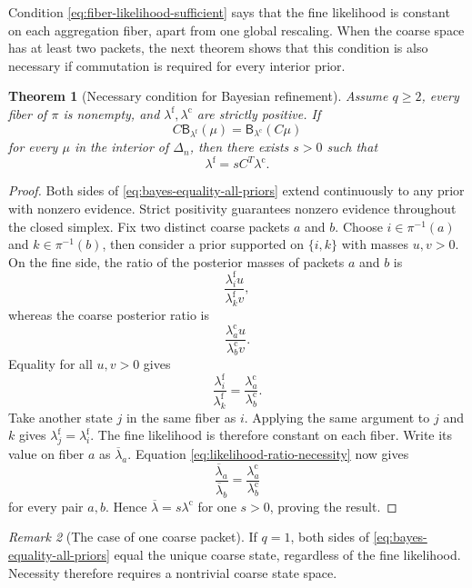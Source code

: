 \documentclass[11pt]{article}
\newtheorem{theorem}{Theorem}[section]
\theoremstyle{definition}
\theoremstyle{remark}
\newtheorem{remark}[theorem]{Remark}
\newcommand{\fine}{\mathrm f}
\newcommand{\coarse}{\mathrm c}
\newcommand{\Bup}{\mathsf B}
\begin{document}
Condition \eqref{eq:fiber-likelihood-sufficient} says that the fine likelihood is constant on each aggregation fiber, apart from one global rescaling.  When the coarse space has at least two packets, the next theorem shows that this condition is also necessary if commutation is required for every interior prior.

\begin{theorem}[Necessary condition for Bayesian refinement]\label{thm:bayes-necessity}
Assume $q\geq2$, every fiber of $\pi$ is nonempty, and $\lambda^{\fine},\lambda^{\coarse}$ are strictly positive.  If
\begin{equation}\label{eq:bayes-equality-all-priors}
  C\Bup_{\lambda^{\fine}}(\mu)
  =
  \Bup_{\lambda^{\coarse}}(C\mu)
\end{equation}
for every $\mu$ in the interior of $\Delta_n$, then there exists $s>0$ such that
\[
  \lambda^{\fine}=sC^T\lambda^{\coarse}.
\]
\end{theorem}

\begin{proof}
Both sides of \eqref{eq:bayes-equality-all-priors} extend continuously to any prior with nonzero evidence.  Strict positivity guarantees nonzero evidence throughout the closed simplex.  Fix two distinct coarse packets $a$ and $b$.  Choose $i\in\pi^{-1}(a)$ and $k\in\pi^{-1}(b)$, then consider a prior supported on $\{i,k\}$ with masses $u,v>0$.  On the fine side, the ratio of the posterior masses of packets $a$ and $b$ is
\[
  \frac{\lambda_i^{\fine}u}{\lambda_k^{\fine}v},
\]
whereas the coarse posterior ratio is
\[
  \frac{\lambda_a^{\coarse}u}{\lambda_b^{\coarse}v}.
\]
Equality for all $u,v>0$ gives
\begin{equation}\label{eq:likelihood-ratio-necessity}
  \frac{\lambda_i^{\fine}}{\lambda_k^{\fine}}
  =
  \frac{\lambda_a^{\coarse}}{\lambda_b^{\coarse}}.
\end{equation}
Take another state $j$ in the same fiber as $i$.  Applying the same argument to $j$ and $k$ gives $\lambda_j^{\fine}=\lambda_i^{\fine}$.  The fine likelihood is therefore constant on each fiber.  Write its value on fiber $a$ as $\overline\lambda_a$.  Equation \eqref{eq:likelihood-ratio-necessity} now gives
\[
  \frac{\overline\lambda_a}{\overline\lambda_b}
  =
  \frac{\lambda_a^{\coarse}}{\lambda_b^{\coarse}}
\]
for every pair $a,b$.  Hence $\overline\lambda=s\lambda^{\coarse}$ for one $s>0$, proving the result.
\end{proof}

\begin{remark}[The case of one coarse packet]
If $q=1$, both sides of \eqref{eq:bayes-equality-all-priors} equal the unique coarse state, regardless of the fine likelihood.  Necessity therefore requires a nontrivial coarse state space.
\end{remark}
\end{document}
